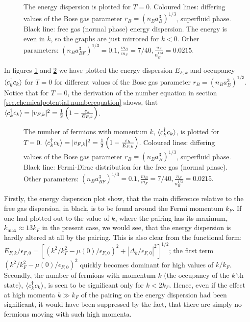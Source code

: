 \begin{figure} 
\begin{center}  
  
\caption{The energy dispersion is plotted for $T = 0$. Coloured lines: differing values of the Bose gas parameter $r_B = (n_Ba_B^3)^{1/3}$, superfluid phase. Black line: free gas (normal phase) energy dispersion. The energy is even in $k$, so the graphs are just mirrored for $k < 0$. Other parameters: $(n_Ba_{BF}^3)^{1/3} = 0.1, \frac{m_B}{m_F} = 7/40, \frac{n_F}{n_B^{1/3}} = 0.0215.$ }  
\label{fig.EnergyDispersion}  
\end{center}    
\end{figure}

In figures \ref{fig.EnergyDispersion} and \ref{fig.Occupancy} we have plotted the energy dispersion $E_{F,k}$ and occupancy $\braket{c_k^\dagger c_k}$ for $T = 0$ for different values of the Bose gas parameter $r_B = (n_Ba_B^3)^{1/3}$. Notice that for $T = 0$, the derivation of the number equation in section \ref{sec.chemicalpotential.numberequation} shows, that $\braket{c_k^\dagger c_k} = |v_{F,k}|^2 = \frac{1}{2}\left(1 -  \frac{\varepsilon_k}{E_{F,k}}\right)$. 

\begin{figure} 
\begin{center}  
  
\caption{The number of fermions with momentum $k$, $\braket{c_k^\dagger c_k}$, is plotted for $T = 0$. $\braket{c_k^\dagger c_k} = |v_{F,k}|^2 = \frac{1}{2}\left(1 - \frac{\epsilon_k}{E_{F,k}}\right)$. Coloured lines: differing values of the Bose gas parameter $r_B = (n_Ba_B^3)^{1/3}$, superfluid phase. Black line: Fermi-Dirac distribution for the free gas (normal phase). Other parameters: $(n_Ba_{BF}^3)^{1/3} = 0.1, \frac{m_B}{m_F} = 7/40, \frac{n_F}{n_B^{1/3}} = 0.0215.$  }  
\label{fig.Occupancy}  
\end{center}    
\end{figure}

Firstly, the energy dispersion plot show, that the main difference relative to the free gas dispersion, in black, is to be found around the Fermi momentum $k_F$. If one had plotted out to the value of $k$, where the pairing has its maximum, $k_{\max} \approx 13 k_F$ in the present case, we would see, that the energy dispersion is hardly altered at all by the pairing. This is also clear from the functional form: $E_{F,k}/\epsilon_{F,0} = [(k^2/k_F^2 - \mu(0)/\epsilon_{F,0})^2 + |\Delta_k/\epsilon_{F,0}|^2 ]^{1/2}$; the first term $(k^2/k_F^2 - \mu(0)/\epsilon_{F,0})^2$ quickly becomes dominant for high values of $k/k_F$. Secondly, the number of fermions with momentum $k$ (the occupancy of the $k$'th state), $\braket{c_k^\dagger c_k}$, is seen to be significant only for $k < 2k_F$. Hence, even if the effect at high momenta $k \gg k_F$ of the pairing on the energy dispersion had been significant, it would have been suppressed by the fact, that there are simply no fermions moving with such high momenta.

